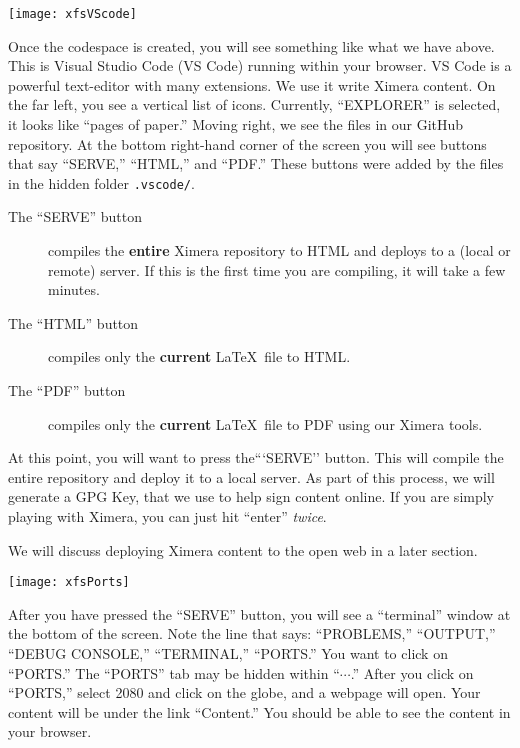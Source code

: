 \documentclass{ximera}
\begin{document}
\begin{image}
    \texttt{[image: xfsVScode]}
\end{image}
        Once the codespace is created, you will see something like what we have
        above. This is Visual Studio Code (VS Code) running within your browser. VS Code
        is a powerful text-editor with many extensions. We use it write Ximera content.
        On the far left, you see a vertical list of icons. Currently, ``EXPLORER'' is
        selected, it looks like ``pages of paper.'' Moving right, we see the files in
        our GitHub repository. At the bottom right-hand corner of the screen you will see
        buttons that say ``SERVE,''  ``HTML,'' and ``PDF.'' These buttons were added by the files
        in the hidden folder \verb!.vscode/!.
        \begin{description}
            \item[The ``SERVE'' button] compiles the \textbf{entire} Ximera repository to HTML and deploys to a (local or remote) server. If this is the first time you are compiling, it will take a few minutes.
        \item[The ``HTML'' button] compiles only the \textbf{current} \LaTeX\ file to HTML.
        \item[The ``PDF'' button] compiles only the \textbf{current} \LaTeX\ file to PDF using our Ximera tools.
        \end{description}
        At this point, you will want to press the```SERVE'' button. This will
        compile the entire repository and deploy it to a local server. As part of this process, 
        we will generate a GPG Key, that we use to help sign content online. 
        If you are simply playing with Ximera, you can just hit ``enter'' \textit{twice}.



        We will discuss deploying Ximera content to the open web in a later section.
        
        \pdfOnly{\end{multicols*}}

\newpage

\begin{image}
    \texttt{[image: xfsPorts]}
\end{image}

    After you have pressed the ``SERVE'' button, you will see a
        ``terminal'' window at the bottom of the screen. 
        Note the line that says: ``PROBLEMS,'' ``OUTPUT,'' ``DEBUG CONSOLE,''
        ``TERMINAL,'' ``PORTS.''
        You want
        to click on ``PORTS.'' The ``PORTS'' tab may be hidden within
        ``$\cdots$.''
        After you click on ``PORTS,'' select 2080 and click on the globe, and a
        webpage
        will open. Your
        content will be under the link ``Content.'' You should be able to see
        the
        content in your browser.
\end{document}
